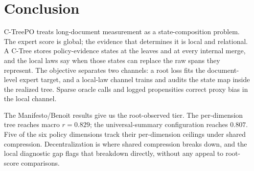 \section{Conclusion}\label{sec:v8-conclusion}

C-TreePO treats long-document measurement as a state-composition
problem. The expert score is global; the evidence that determines it
is local and relational. A C-Tree stores policy-evidence states at
the leaves and at every internal merge, and the local laws say when
those states can replace the raw spans they represent. The objective
separates two channels: a root loss fits the document-level expert
target, and a local-law channel trains and audits the state map
inside the realized tree. Sparse oracle calls and logged
propensities correct proxy bias in the local channel.

The Manifesto/Benoit results give us the root-observed tier. The
per-dimension tree reaches macro \(r=0.829\); the universal-summary
configuration reaches \(0.807\). Five of the six policy dimensions
track their per-dimension ceilings under shared compression.
Decentralization is where shared compression breaks down, and the
local diagnostic gap flags that breakdown directly, without any
appeal to root-score comparisons.

